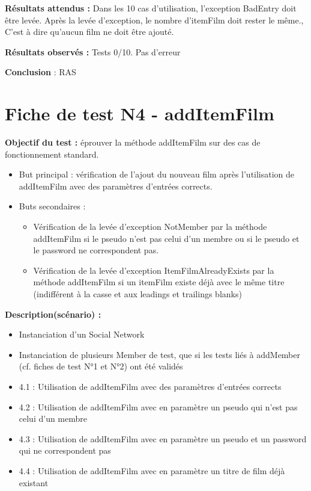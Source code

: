 \documentclass[12pt,a4paper]{report}
\begin{document}
\textbf{Résultats attendus :}
Dans les 10 cas d'utilisation, l'exception BadEntry doit être levée.
Après la levée d'exception, le nombre d'itemFilm doit rester le même., C'est à dire qu'aucun film ne doit être ajouté.

\textbf{Résultats observés : }
Tests 0/10. Pas d'erreur

\textbf{Conclusion }: RAS

\chapter{Fiche de test N4 - addItemFilm}  

\textbf{Objectif du test : }éprouver la méthode addItemFilm sur des cas de fonctionnement standard.
\begin{itemize}
	\item	But principal : vérification de l'ajout du nouveau film après l'utilisation de addItemFilm avec des paramètres d'entrées corrects.
	\item	Buts secondaires : 
	\begin{itemize}
		\item Vérification de la levée d'exception NotMember par la méthode addItemFilm si le pseudo n'est pas celui d'un membre ou si le pseudo et le password ne correspondent pas.
		\item Vérification de la levée d'exception ItemFilmAlreadyExists par la méthode addItemFilm si un itemFilm existe déjà avec le même titre (indifférent à la casse et aux leadings et trailings blanks)
	\end{itemize}

\end{itemize}

\textbf{Description(scénario) :}
\begin{itemize}
	\item	Instanciation d'un Social Network
	\item	Instanciation de plusieurs Member de test, que si les tests liés à addMember (cf. fiches de test N°1 et N°2) ont été validés
	\item	4.1 : Utilisation de addItemFilm avec des paramètres d'entrées corrects
	\item	4.2 : Utilisation de addItemFilm avec en paramètre un pseudo qui n'est pas celui d'un membre
	\item	4.3 : Utilisation de addItemFilm avec en paramètre un pseudo et un password qui ne correspondent pas
	\item	4.4 : Utilisation de addItemFilm avec en paramètre un titre de film déjà existant

\end{itemize}
\end{document}
